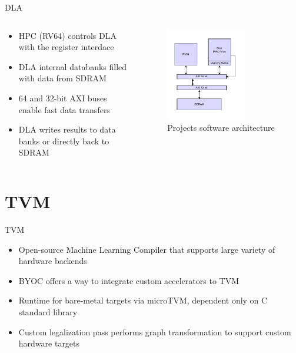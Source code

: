 \begin{frame}{DLA}
\begin{columns}
    \begin{column}{0.5\textwidth}
      \begin{itemize}
              \item HPC (RV64) controls DLA with the register interdace
              \item DLA internal databanks filled with data from SDRAM
              \item 64 and 32-bit AXI buses enable fast data transfers
              \item DLA writes results to data banks or directly back to SDRAM
      \end{itemize}
      \end{column}
    \begin{column}{0.5\textwidth}
  \begin{figure}
    \includegraphics[width=0.7\textwidth]{../../thesis/img/dla-setup.drawio.pdf}
    \caption{Projects software architecture}
  \end{figure}
    \end{column}
\end{columns}
\end{frame}

\section{TVM}
\begin{frame}{TVM}
  \begin{itemize}
          \item Open-source Machine Learning Compiler that supports large variety of hardware backends~\cite{TVM}
          \item BYOC offers a way to integrate custom accelerators to TVM
          \item Runtime for bare-metal targets via microTVM, dependent only on C standard library
          \item Custom legalization pass performs graph transformation to support custom hardware targets
  \end{itemize}
\end{frame}

